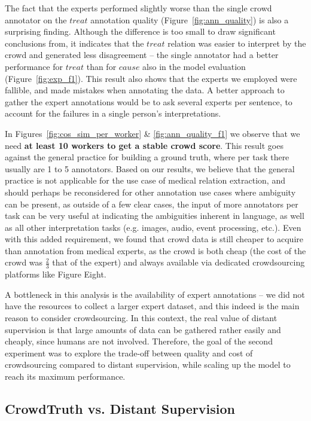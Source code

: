 The fact that the experts performed slightly worse than the single crowd annotator on the $treat$ annotation quality (Figure~\ref{fig:ann_quality}) is also a surprising finding. Although the difference is too small to draw significant conclusions from, it indicates that the $treat$ relation was easier to interpret by the crowd and generated less disagreement -- the single annotator had a better performance for $treat$ than for $cause$ also in the model evaluation (Figure~\ref{fig:exp_f1}). This result also shows that the experts we employed were fallible, and made mistakes when annotating the data. A better approach to gather the expert annotations would be to ask several experts per sentence, to account for the failures in a single person's interpretations.

In Figures~\ref{fig:cos_sim_per_worker} \& \ref{fig:ann_quality_f1} we observe that we need \textbf{at least 10 workers to get a stable crowd score}. This result goes against the general practice for building a ground truth, where per task there usually are 1 to 5 annotators. Based on our results, we believe that the general practice is not applicable for the use case of medical relation extraction, and should perhaps be reconsidered for other annotation use cases where ambiguity can be present, as outside of a few clear cases, the input of more annotators per task can be very useful at indicating the ambiguities inherent in language, as well as all other interpretation tasks (e.g. images, audio, event processing, etc.). Even with this added requirement, we found that crowd data is still cheaper to acquire than annotation from medical experts, as the crowd is both cheap (the cost of the crowd was $\frac{2}{3}$ that of the expert) and always available via dedicated crowdsourcing platforms like Figure Eight.

A bottleneck in this analysis is the availability of expert annotations -- we did not have the resources to collect a larger expert dataset, and this indeed is the main reason to consider crowdsourcing. In this context, the real value of distant supervision is that large amounts of data can be gathered rather easily and cheaply, since humans are not involved. Therefore, the goal of the second experiment was to explore the trade-off between quality and cost of crowdsourcing compared to distant supervision, while scaling up the model to reach its maximum performance.

\subsection{CrowdTruth vs. Distant Supervision}
\label{sec:ct-ds}

